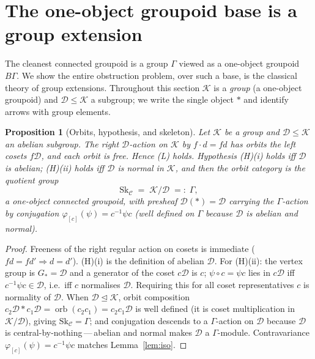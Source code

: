 \documentclass[11pt]{article}
\newtheorem{proposition}[theorem]{Proposition}
\theoremstyle{definition}
\newcommand{\C}{\mathcal{C}}
\newcommand{\D}{\mathcal{D}}
\newcommand{\K}{\mathcal{K}}
\newcommand{\Sk}{\mathrm{Sk}}
\newcommand{\orb}{\operatorname{orb}}
\begin{document}
\section{The one-object groupoid base is a group extension}\label{sec:reduction}

The cleanest connected groupoid is a group $\Gamma$ viewed as a one-object
groupoid $B\Gamma$. We show the entire obstruction problem, over such a base, is
the classical theory of group extensions. Throughout this section $\K$ is a
\emph{group} (a one-object groupoid) and $\D\le\K$ a subgroup; we write the single
object $\ast$ and identify arrows with group elements.

\begin{proposition}[Orbits, hypothesis, and skeleton]\label{prop:setup}
Let $\K$ be a group and $\D\le\K$ an abelian subgroup. The right $\D$-action on
$\K$ by $f\cdot d=fd$ has orbits the left cosets $f\D$, and each orbit is free.
Hence \textnormal{(L)} holds. Hypothesis \textnormal{(H)(i)} holds iff $\D$ is
abelian; \textnormal{(H)(ii)} holds iff $\D$ is \emph{normal} in $\K$, and then the
orbit category is the quotient group
\[
   \Sk_\C \;=\; \K/\D \;=:\;\Gamma ,
\]
a one-object connected groupoid, with presheaf $\D(\ast)=\D$ carrying the
$\Gamma$-action by conjugation $\varphi_{[c]}(\psi)=c^{-1}\psi c$ (well defined on
$\Gamma$ because $\D$ is abelian and normal).
\end{proposition}
\begin{proof}
Freeness of the right regular action on cosets is immediate ($fd=fd'\Rightarrow
d=d'$). \textnormal{(H)(i)} is the definition of abelian $\D$. For
\textnormal{(H)(ii)}: the vertex group is $G_\ast=\D$ and a generator of the coset
$c\D$ is $c$; $\psi\circ c=\psi c$ lies in $c\D$ iff $c^{-1}\psi c\in\D$, i.e.\ iff
$c$ normalises $\D$. Requiring this for all coset representatives $c$ is
normality of $\D$. When $\D\trianglelefteq\K$, orbit composition
$c_2\D\ast c_1\D=\orb(c_2c_1)=c_2c_1\D$ is well defined (it is coset multiplication
in $\K/\D$), giving $\Sk_\C=\Gamma$; and conjugation descends to a
$\Gamma$-action on $\D$ because $\D$ is central-by-nothing\,---\,abelian and normal
makes $\D$ a $\Gamma$-module. Contravariance $\varphi_{[c]}(\psi)=c^{-1}\psi c$
matches Lemma~\ref{lem:iso}.
\end{proof}
\end{document}
